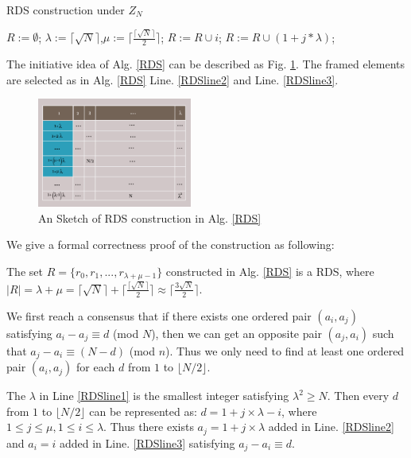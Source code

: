 \begin{algorithm}
\caption{RDS construction under $Z_N$}
\label{RDS}
\begin{algorithmic}[1]
\STATE $R :=\emptyset$;
\STATE $\lambda :=\lceil \sqrt{N}  \rceil$,$\mu :=\lceil \frac{\lceil \sqrt{N} \rceil}{2} \rceil$;\label{RDSline1}
	\STATE $R :=R \cup i$; \label{RDSline2}
\ENDFOR
{}
	\STATE $R :=R \cup (1 + j * \lambda )$; \label{RDSline3}
\ENDFOR
\end{algorithmic}
\end{algorithm}


The initiative idea of Alg. \ref{RDS} can be described as Fig. \ref{matrix}. 
The framed elements are selected as in Alg. \ref{RDS} 
Line. \ref{RDSline2} and Line. \ref{RDSline3}. 

\begin{figure}[htb]
\centering
\includegraphics[width=2in]{./Figure/matrix}
\caption{An Sketch of RDS construction in Alg. \ref{RDS}}
\label{matrix}
\end{figure}

We give a formal correctness proof of the construction as following:

\begin{theorem}
\label{RDS1}
The set $R = \{r_0, r_1, ..., r_{\lambda + \mu - 1}\}$ constructed in Alg. \ref{RDS} is a RDS,
where $|R| = \lambda + \mu = \lceil \sqrt{N}  \rceil + \lceil \frac{\lceil \sqrt{N} \rceil}{2} \rceil
\approx \lceil \frac{3\sqrt{N}}{2}  \rceil$.
\end{theorem}


\begin{IEEEproof}
We first reach a consensus that if there exists one ordered 
pair $(a_i,a_j)$ satisfying  $a_i - a_j \equiv d$ (mod $N$),
then we can get an opposite pair $(a_j,a_i)$ such that  
$a_j - a_i \equiv (N-d)$ (mod $n$). Thus we only need to find 
at least one ordered pair $(a_i,a_j)$ for each $d$ from $1$ to $\lfloor N/2 \rfloor$.

The $\lambda$ in Line \ref{RDSline1} is the smallest integer satisfying 
$\lambda^2 \geq N$. Then every $d$ from $1$ to $\lfloor N/2 \rfloor$ 
can be represented as: $ d = 1 + j \times \lambda - i$, where $1 \leq j \leq \mu, 
1 \leq i \leq \lambda$. Thus there exists $a_j = 1 + j \times \lambda$ 
added in Line. \ref{RDSline2} and $a_i = i$ added in Line. \ref{RDSline3} 
satisfying  $a_j - a_i \equiv d$.
\end{IEEEproof}


